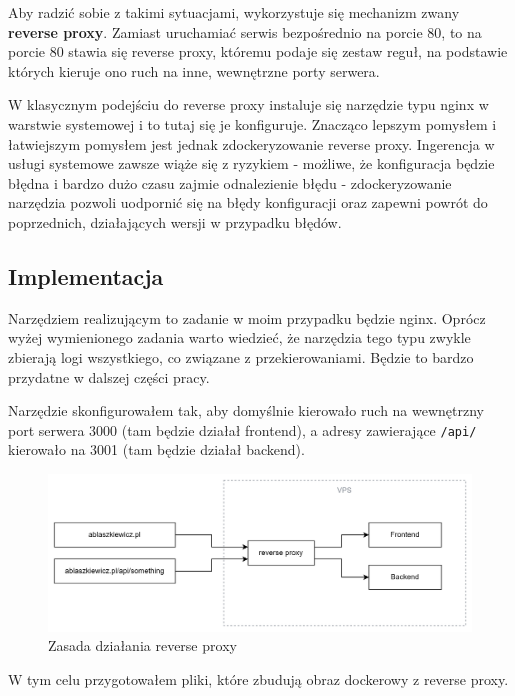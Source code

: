 \documentclass{article}
\begin{document}
Aby radzić sobie z takimi sytuacjami, wykorzystuje się mechanizm zwany \textbf{reverse proxy}. Zamiast uruchamiać serwis bezpośrednio na porcie 80, to na porcie 80 stawia się reverse proxy, któremu podaje się zestaw reguł, na podstawie których kieruje ono ruch na inne, wewnętrzne porty serwera.

W klasycznym podejściu do reverse proxy instaluje się narzędzie typu nginx w warstwie systemowej i to tutaj się je konfiguruje. Znacząco lepszym pomysłem i łatwiejszym pomysłem jest jednak zdockeryzowanie reverse proxy. Ingerencja w usługi systemowe zawsze wiąże się z ryzykiem - możliwe, że konfiguracja będzie błędna i bardzo dużo czasu zajmie odnalezienie błędu - zdockeryzowanie narzędzia pozwoli uodpornić się na błędy konfiguracji oraz zapewni powrót do poprzednich, działających wersji w przypadku błędów.

\subsection{Implementacja}

Narzędziem realizującym to zadanie w moim przypadku będzie nginx. Oprócz wyżej wymienionego zadania warto wiedzieć, że narzędzia tego typu zwykle zbierają logi wszystkiego, co związane z przekierowaniami. Będzie to bardzo przydatne w dalszej części pracy.

Narzędzie skonfigurowałem tak, aby domyślnie kierowało ruch na wewnętrzny port serwera 3000 (tam będzie działał frontend), a adresy zawierające \lstinline|/api/| kierowało na 3001 (tam będzie działał backend).

\begin{figure}[H]
    \centering
    \includegraphics[width=1\linewidth]{reverseProxyDiagram.png}
    \caption{Zasada działania reverse proxy}
    \label{fig:enter-label}
\end{figure}

W tym celu przygotowałem pliki, które zbudują obraz dockerowy z reverse proxy.
\end{document}
